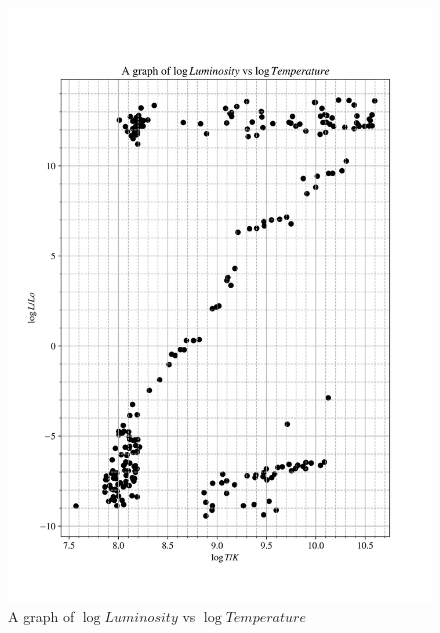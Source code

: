 \documentclass[12pt, a4paper]{article}
\begin{document}
\begin{figure}[H]
    \centering
    \includegraphics[width = \textwidth]{2Plot2.png}
    \caption{A graph of \(\log{Luminosity}\) vs \(\log{Temperature}\)}
\end{figure}
\end{document}
